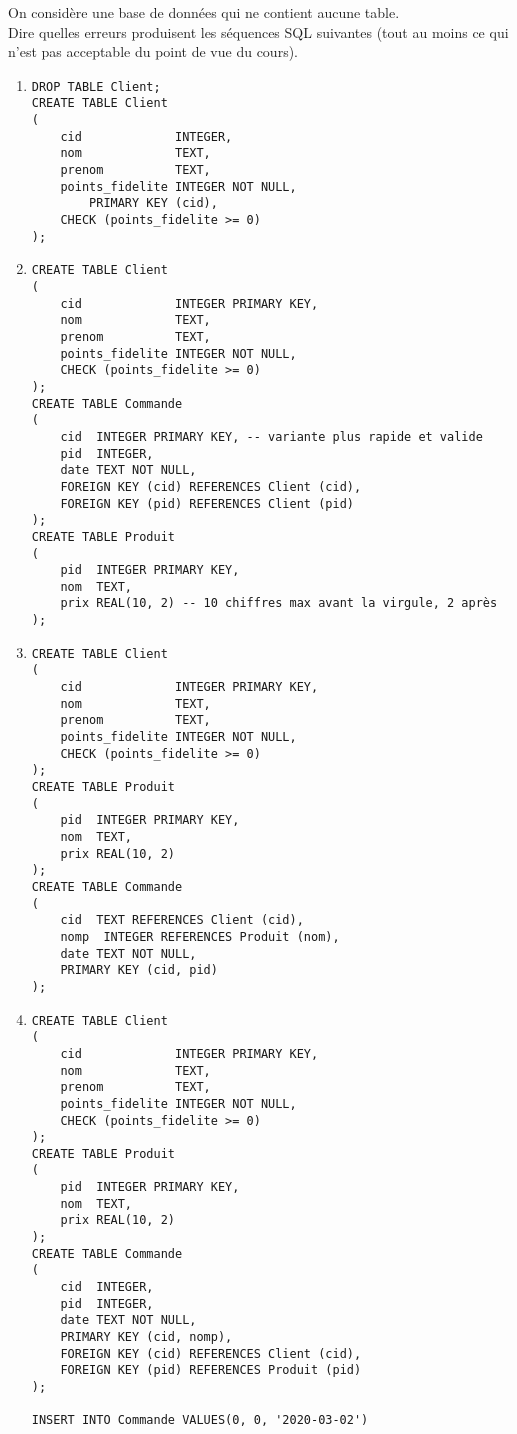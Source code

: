 \documentclass[a4paper,12pt,french]{article}
\begin{document}
\begin{exercice}[]
On considère une base de données qui ne contient aucune table.\\
Dire quelles erreurs produisent les séquences SQL suivantes (tout au moins ce qui n'est pas acceptable du point de vue du cours).
\begin{enumerate}[\bfseries 1.]
\item 	\begin{verbatim}
DROP TABLE Client;
CREATE TABLE Client
(
    cid             INTEGER,
    nom             TEXT,
    prenom          TEXT,
    points_fidelite INTEGER NOT NULL,
        PRIMARY KEY (cid),
    CHECK (points_fidelite >= 0)
);
    \end{verbatim}
\item 	\begin{verbatim}
CREATE TABLE Client
(
    cid             INTEGER PRIMARY KEY,
    nom             TEXT,
    prenom          TEXT,
    points_fidelite INTEGER NOT NULL,
    CHECK (points_fidelite >= 0)
);
CREATE TABLE Commande
(
    cid  INTEGER PRIMARY KEY, -- variante plus rapide et valide
    pid  INTEGER,
    date TEXT NOT NULL,
    FOREIGN KEY (cid) REFERENCES Client (cid),
    FOREIGN KEY (pid) REFERENCES Client (pid)
);
CREATE TABLE Produit
(
    pid  INTEGER PRIMARY KEY,
    nom  TEXT,
    prix REAL(10, 2) -- 10 chiffres max avant la virgule, 2 après
);
\end{verbatim}

\item \begin{verbatim}
CREATE TABLE Client
(
    cid             INTEGER PRIMARY KEY,
    nom             TEXT,
    prenom          TEXT,
    points_fidelite INTEGER NOT NULL,
    CHECK (points_fidelite >= 0)
);
CREATE TABLE Produit
(
    pid  INTEGER PRIMARY KEY,
    nom  TEXT,
    prix REAL(10, 2)
);
CREATE TABLE Commande
(
    cid  TEXT REFERENCES Client (cid),
    nomp  INTEGER REFERENCES Produit (nom),
    date TEXT NOT NULL,
    PRIMARY KEY (cid, pid)
);
\end{verbatim}

\item	\begin{verbatim}
CREATE TABLE Client
(
    cid             INTEGER PRIMARY KEY,
    nom             TEXT,
    prenom          TEXT,
    points_fidelite INTEGER NOT NULL,
    CHECK (points_fidelite >= 0)
);
CREATE TABLE Produit
(
    pid  INTEGER PRIMARY KEY,
    nom  TEXT,
    prix REAL(10, 2)
);
CREATE TABLE Commande
(
    cid  INTEGER,
    pid  INTEGER,
    date TEXT NOT NULL,
    PRIMARY KEY (cid, nomp),
    FOREIGN KEY (cid) REFERENCES Client (cid),
    FOREIGN KEY (pid) REFERENCES Produit (pid)
);

INSERT INTO Commande VALUES(0, 0, '2020-03-02')
\end{verbatim}
\end{enumerate}
\end{exercice}
\end{document}
